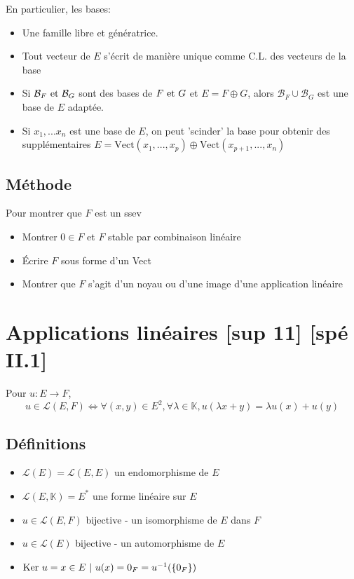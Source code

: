 \documentclass[openany]{book}
\begin{document}
\noindent En particulier, les bases:
\begin{itemize}
    \item Une famille libre et génératrice. 
    \item Tout vecteur de $E$ s'écrit de manière unique comme C.L. des vecteurs de la base
    \item Si $\mathcal{B}_F \text{ et } \mathcal{B}_G$ sont des bases de $F \text{ et } G$ et $E = F \oplus G$, alors $\mathcal{B}_F \cup \mathcal{B}_G$ est une base de $E$ adaptée. 
    \item Si $x_1,...x_n$ est une base de $E$, on peut 'scinder' la base pour obtenir des supplémentaires $ E = \text{Vect}(x_1,...,x_p) \oplus \text{Vect}(x_{p+1},...,x_n) $
\end{itemize}

\subsection{Méthode}
Pour montrer que $F$ est un ssev
\begin{itemize}
    \item Montrer $0 \in F$ et $F$ stable par combinaison linéaire
    \item Écrire $F$ sous forme d'un Vect
    \item Montrer que $F$ s'agit d'un noyau ou d'une image d'une application linéaire
\end{itemize}

\clearpage
\section{Applications linéaires [sup 11] [spé II.1]}
Pour $u: E \rightarrow F$, 
\[ u \in \mathcal{L}(E, F) \iff \forall(x, y) \in E^2, \forall \lambda \in \mathbb{K}, u(\lambda x + y) = \lambda u(x) + u(y) \]

\subsection{Définitions}
\begin{itemize}
    \item $\mathcal{L}(E) = \mathcal{L}(E, E)$ un endomorphisme de $E$
    \item $\mathcal{L}(E, \mathbb{K}) = E^*$ une forme linéaire sur $E$
    \item $u \in \mathcal{L}(E, F)$ bijective - un isomorphisme de $E$ dans $F$
    \item $u \in \mathcal{L}(E)$ bijective - un automorphisme de $E$
    \item $ \text{Ker } u = {x \in E \text{ } | \text{ } u(x) = 0_F} = u^{-1}(\{0_F\}) $
\end{itemize}
\end{document}
